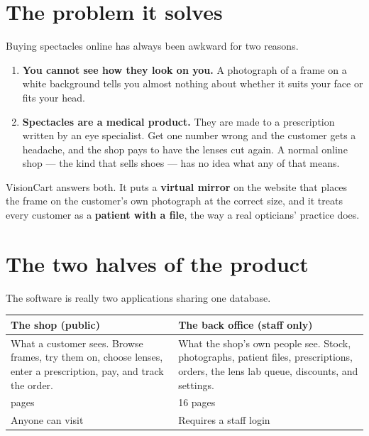\documentclass[11pt,a4paper]{report}
\begin{document}
\section{The problem it solves}

Buying spectacles online has always been awkward for two reasons.

\begin{enumerate}
  \item \textbf{You cannot see how they look on you.} A photograph of a
        frame on a white background tells you almost nothing about whether it
        suits your face or fits your head.
  \item \textbf{Spectacles are a medical product.} They are made to a
        prescription written by an eye specialist. Get one number wrong and
        the customer gets a headache, and the shop pays to have the lenses cut
        again. A normal online shop --- the kind that sells shoes --- has no
        idea what any of that means.
\end{enumerate}

VisionCart answers both. It puts a \textbf{virtual mirror} on the website that
places the frame on the customer's own photograph at the correct size, and it
treats every customer as a \textbf{patient with a file}, the way a real
opticians' practice does.

\section{The two halves of the product}

The software is really two applications sharing one database.

\begin{center}
\begin{tabular}{@{}p{}p{}@{}}
\toprule
\textbf{The shop (public)} & \textbf{The back office (staff only)}\\
\midrule
What a customer sees. Browse frames, try them on, choose lenses, enter a
prescription, pay, and track the order.
&
What the shop's own people see. Stock, photographs, patient files,
prescriptions, orders, the lens lab queue, discounts, and settings.\\
\addlinespace
13 pages & 16 pages\\
Anyone can visit & Requires a staff login\\
\bottomrule
\end{tabular}
\end{center}
\end{document}
